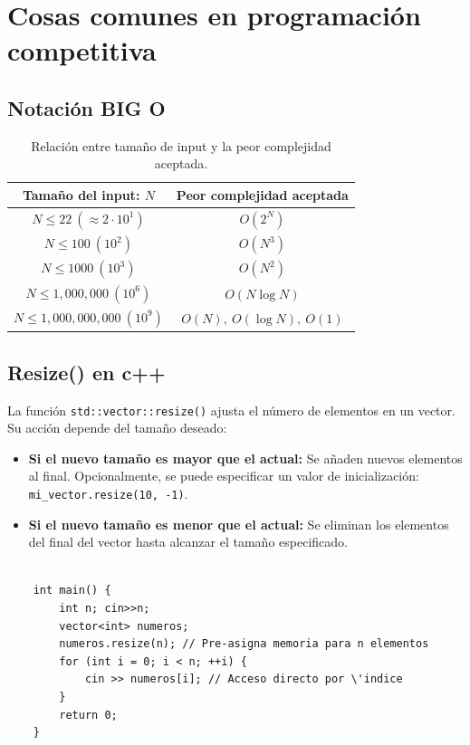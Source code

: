 \section{Cosas comunes en programación competitiva}


\subsection{Notación BIG O}
\begin{table}[h!]
	\centering
	\begin{tabular}{|c|c|}
		\hline
		\textbf{Tamaño del input: $N$} & \textbf{Peor complejidad aceptada} \\ \hline
		$N \leq 22 \ (\approx 2 \cdot 10^1)$ & $O(2^N)$ \\ \hline
		$N \leq 100 \ (10^2)$ & $O(N^3)$ \\ \hline
		$N \leq 1000 \ (10^3)$ & $O(N^2)$ \\ \hline
		$N \leq 1{,}000{,}000 \ (10^6)$ & $O(N \log N)$ \\ \hline
		$N \leq 1{,}000{,}000{,}000 \ (10^9)$ & $O(N),\ O(\log N),\ O(1)$ \\ \hline
	\end{tabular}
	\caption{Relación entre tamaño de input y la peor complejidad aceptada.}
\end{table}

\subsection{Resize() en c++}
La funci\'on \texttt{std::vector::resize()} ajusta el n\'umero de elementos en un vector. Su acci\'on depende del tama\~no deseado:

\begin{itemize}
	\item \textbf{Si el nuevo tama\~no es mayor que el actual:} Se a\~naden nuevos elementos al final. Opcionalmente, se puede especificar un valor de inicializaci\'on: \texttt{mi\_vector.resize(10, -1)}.
	\item \textbf{Si el nuevo tama\~no es menor que el actual:} Se eliminan los elementos del final del vector hasta alcanzar el tama\~no especificado.
\end{itemize}
\begin{lstlisting}[style=mycpp, caption=Uso eficiente de resize]

	int main() {
		int n; cin>>n;
		vector<int> numeros;
		numeros.resize(n); // Pre-asigna memoria para n elementos
		for (int i = 0; i < n; ++i) {
			cin >> numeros[i]; // Acceso directo por \'indice
		}
		return 0;
	}
\end{lstlisting}

